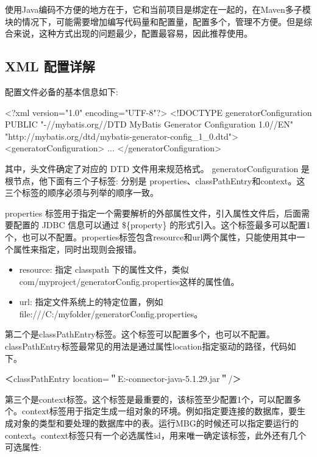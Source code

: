 使用Java编码不方便的地方在于，它和当前项目是绑定在一起的，在Maven多子模块的情况下，可能需要增加编写代码量和配置量，配置多个，管理不方便。但是综合来说，这种方式出现的问题最少，配置最容易，因此推荐使用。

\subsection{XML 配置详解}

配置文件必备的基本信息如下:
\begin{xml}
<?xml version="1.0" encoding="UTF-8"?>
<!DOCTYPE generatorConfiguration
        PUBLIC "-//mybatis.org//DTD MyBatis Generator Configuration 1.0//EN"
        "http://mybatis.org/dtd/mybatis-generator-config_1_0.dtd">
<generatorConfiguration>
...
</generatorConfiguration>
\end{xml}

其中，头文件确定了对应的 DTD 文件用来规范格式。 generatorConfiguration 是根节点，他下面有三个子标签: 分别是 properties、classPathEntry和context。这三个标签的顺序必须与列举的顺序一致。

properties 标签用于指定一个需要解析的外部属性文件，引入属性文件后，后面需要配置的 JDBC 信息可以通过 \$\{property\} 的形式引入。这个标签最多可以配置1个，也可以不配置。properties标签包含resource和url两个属性，只能使用其中一个属性来指定，同时出现则会报错。
\begin{itemize}
    \item resource: 指定 classpath 下的属性文件，类似com/myproject/generatorConfig.properties这样的属性值。
    \item url: 指定文件系统上的特定位置，例如 file:///C:/myfolder/generatorConfig.properties。
\end{itemize}

第二个是classPathEntry标签。这个标签可以配置多个，也可以不配置。 classPathEntry标签最常见的用法是通过属性location指定驱动的路径，代码如下。
\begin{xml}
＜classPathEntry location=＂E:\mysql\mysql-connector-java-5.1.29.jar＂/＞
\end{xml}

第三个是context标签。这个标签是最重要的，该标签至少配置1个，可以配置多个。context标签用于指定生成一组对象的环境。例如指定要连接的数据库，要生成对象的类型和要处理的数据库中的表。运行MBG的时候还可以指定要运行的context。context标签只有一个必选属性id，用来唯一确定该标签，此外还有几个可选属性:

